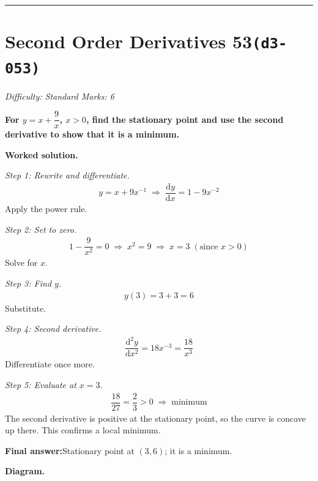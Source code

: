 \documentclass[11pt]{article}
\newcommand{\question}[1]{\par\medskip\noindent\textbf{#1}\par}
\begin{document}
\medskip\hrule

\section*{Second Order Derivatives 53\quad\small\texttt{(d3-053)}}
\textit{Difficulty: Standard \quad\textbar\quad Marks: 6}

\question{For \( y = x + \dfrac{9}{x} \), \( x > 0 \), find the stationary point and use the second derivative to show that it is a minimum.}

\textbf{Worked solution.}

\textit{Step 1: Rewrite and differentiate.}
\[\begin{gathered}
y = x + 9x^{-1} \;\Rightarrow\; \dfrac{\mathrm{d}y}{\mathrm{d}x} = 1 - 9x^{-2}
\end{gathered}\]
Apply the power rule.

\textit{Step 2: Set to zero.}
\[\begin{gathered}
1 - \dfrac{9}{x^2} = 0 \;\Rightarrow\; x^2 = 9 \;\Rightarrow\; x = 3 \; (\text{since } x > 0)
\end{gathered}\]
Solve for \( x \).

\textit{Step 3: Find \( y \).}
\[\begin{gathered}
y(3) = 3 + 3 = 6
\end{gathered}\]
Substitute.

\textit{Step 4: Second derivative.}
\[\begin{gathered}
\dfrac{\mathrm{d}^2y}{\mathrm{d}x^2} = 18x^{-3} = \dfrac{18}{x^3}
\end{gathered}\]
Differentiate once more.

\textit{Step 5: Evaluate at \( x = 3 \).}
\[\begin{gathered}
\dfrac{18}{27} = \dfrac{2}{3} > 0 \; \Rightarrow \; \text{minimum}
\end{gathered}\]
The second derivative is positive at the stationary point, so the curve is concave up there. This confirms a local minimum.

\begin{answerbox}
\textbf{Final answer:}\quad Stationary point at \(\displaystyle  (3, 6) \); it is a minimum.
\end{answerbox}
\textbf{Diagram.}
\end{document}
